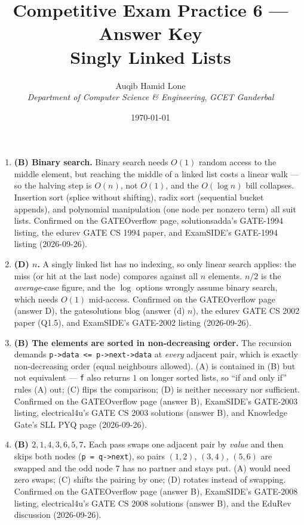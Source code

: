 \documentclass[11pt]{article}
\title{Competitive Exam Practice 6 --- Answer Key\\\large Singly Linked Lists}
\author{Auqib Hamid Lone\\[0.3em]
  \emph{Department of Computer Science \& Engineering}, \emph{GCET Ganderbal}}
\date{\today}
\begin{document}
\maketitle

\begin{enumerate}
\item[\textbf{Q1}] \textbf{(B) Binary search.} Binary search needs $O(1)$ random access to the middle element, but reaching the middle of a linked list costs a linear walk --- so the halving step is $O(n)$, not $O(1)$, and the $O(\log n)$ bill collapses. Insertion sort (splice without shifting), radix sort (sequential bucket appends), and polynomial manipulation (one node per nonzero term) all suit lists. Confirmed on the GATEOverflow page, solutionsadda's GATE-1994 listing, the edurev GATE CS 1994 paper, and ExamSIDE's GATE-1994 listing (2026-09-26).

\item[\textbf{Q2}] \textbf{(D) $n$.} A singly linked list has no indexing, so only linear search applies: the miss (or hit at the last node) compares against all $n$ elements. $n/2$ is the \emph{average}-case figure, and the $\log$ options wrongly assume binary search, which needs $O(1)$ mid-access. Confirmed on the GATEOverflow page (answer D), the gatesolutions blog (answer (d) $n$), the edurev GATE CS 2002 paper (Q1.5), and ExamSIDE's GATE-2002 listing (2026-09-26).

\item[\textbf{Q3}] \textbf{(B) The elements are sorted in non-decreasing order.} The recursion demands \texttt{p->data <= p->next->data} at \emph{every} adjacent pair, which is exactly non-decreasing order (equal neighbours allowed). (A) is contained in (B) but not equivalent --- \texttt{f} also returns $1$ on longer sorted lists, so ``if and only if'' rules (A) out; (C) flips the comparison; (D) is neither necessary nor sufficient. Confirmed on the GATEOverflow page (answer B), ExamSIDE's GATE-2003 listing, electrical4u's GATE CS 2003 solutions (answer B), and Knowledge Gate's SLL PYQ page (2026-09-26).

\item[\textbf{Q4}] \textbf{(B) $2, 1, 4, 3, 6, 5, 7$.} Each pass swaps one adjacent pair by \emph{value} and then skips both nodes (\texttt{p = q->next}), so pairs $(1,2)$, $(3,4)$, $(5,6)$ are swapped and the odd node $7$ has no partner and stays put. (A) would need zero swaps; (C) shifts the pairing by one; (D) rotates instead of swapping. Confirmed on the GATEOverflow page (answer B), ExamSIDE's GATE-2008 listing, electrical4u's GATE CS 2008 solutions (answer B), and the EduRev discussion (2026-09-26).


\end{enumerate}
\end{document}
